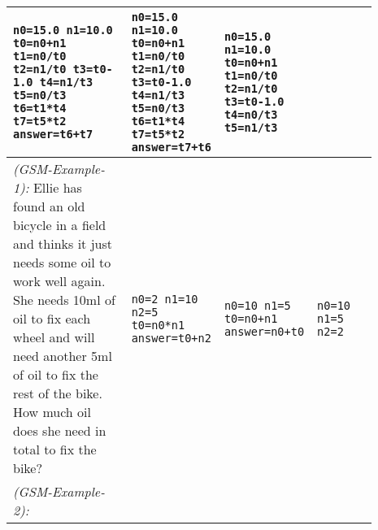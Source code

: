 \begin{table}[t]
\begin{tabular}{p{0.35\linewidth}p{0.18\linewidth}p{0.18\linewidth}p{0.18\linewidth}}
\texttt{n0=15.0\newline
n1=10.0\newline
t0=n0+n1\newline
t1=n0/t0\newline
t2=n1/t0\newline
t3=t0-1.0\newline
t4=n1/t3\newline
t5=n0/t3\newline
t6=t1*t4\newline
t7=t5*t2\newline
answer=t6+t7} &
\texttt{n0=15.0\newline
n1=10.0\newline
t0=n0+n1\newline
t1=n0/t0\newline
t2=n1/t0\newline
t3=t0-1.0\newline
t4=n1/t3\newline
t5=n0/t3\newline
t6=t1*t4\newline
t7=t5*t2\newline
answer=t7+t6} &
\texttt{n0=15.0\newline
n1=10.0\newline
t0=n0+n1\newline
t1=n0/t0\newline
t2=n1/t0\newline
t3=t0-1.0\newline
t4=n0/t3\newline
t5=n1/t3} \\\midrule
\textit{(GSM-Example-1):} \newline
Ellie has found an old bicycle in a field and thinks it just needs some oil to work well again.  She needs 10ml of oil to fix each wheel and will need another 5ml of oil to fix the rest of the bike. How much oil does she need in total to fix the bike? & 
\texttt{n0=2\newline
n1=10\newline
n2=5\newline
t0=n0*n1\newline
answer=t0+n2} &
\texttt{n0=10\newline
n1=5\newline
t0=n0+n1\newline
answer=n0+t0} &
\texttt{n0=10\newline
n1=5\newline
n2=2} \\\midrule
\textit{(GSM-Example-2):} \newline

\end{tabular}
\end{table}
